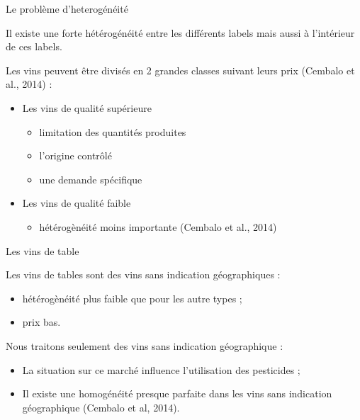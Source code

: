 \documentclass[11pt,ignorenonframetext,]{beamer}
\providecommand{\tightlist}{%
  \setlength{\itemsep}{0pt}\setlength{\parskip}{0pt}}
\begin{document}
\begin{frame}{Le problème d'heterogénéité}
\protect\hypertarget{le-probleme-dheterogeneite}{}

Il existe une forte hétérogénéité entre les différents labels mais aussi
à l'intérieur de ces labels.

Les vins peuvent être divisés en 2 grandes classes suivant leurs prix
(Cembalo et al., 2014) :

\begin{itemize}
\tightlist
\item
  Les vins de qualité supérieure

  \begin{itemize}
  \tightlist
  \item
    limitation des quantités produites
  \item
    l'origine contrôlé
  \item
    une demande spécifique
  \end{itemize}
\item
  Les vins de qualité faible

  \begin{itemize}
  \tightlist
  \item
    hétérogènéité moins importante (Cembalo et al., 2014)
  \end{itemize}
\end{itemize}

\end{frame}

\begin{frame}{Les vins de table}
\protect\hypertarget{les-vins-de-table}{}

Les vins de tables sont des vins sans indication géographiques :

\begin{itemize}
\tightlist
\item
  hétérogènéité plus faible que pour les autre types ;
\item
  prix bas.
\end{itemize}

Nous traitons seulement des vins sans indication géographique :

\begin{itemize}
\tightlist
\item
  La situation sur ce marché influence l'utilisation des pesticides ;
\item
  Il existe une homogénéité presque parfaite dans les vins sans
  indication géographique (Cembalo et al, 2014).
\end{itemize}

\end{frame}
\end{document}
